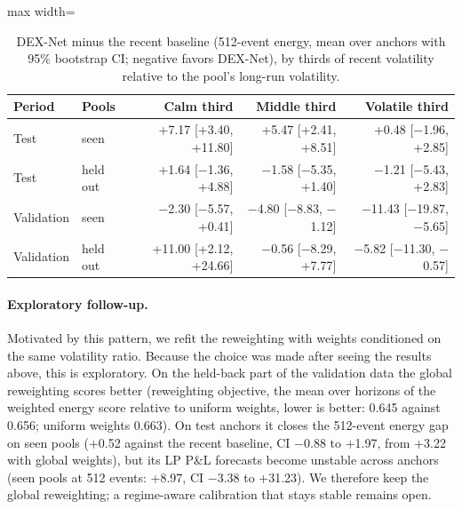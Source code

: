 \documentclass[11pt]{article}
\begin{document}
\begin{table}[t]
\centering
\caption{DEX-Net minus the recent baseline (512-event energy, mean over anchors with 95\% bootstrap CI; negative favors DEX-Net), by thirds of recent volatility relative to the pool's long-run volatility.}\label{tab:6}
\begin{adjustbox}{max width=\linewidth}
\begin{tabular}{llrrr}
\toprule
Period & Pools & Calm third & Middle third & Volatile third \\
\midrule
Test & seen & +7.17 [+3.40, +11.80] & +5.47 [+2.41, +8.51] & +0.48 [\ensuremath{-}1.96, +2.85] \\
\midrule
Test & held out & +1.64 [\ensuremath{-}1.36, +4.88] & \ensuremath{-}1.58 [\ensuremath{-}5.35, +1.40] & \ensuremath{-}1.21 [\ensuremath{-}5.43, +2.83] \\
\midrule
Validation & seen & \ensuremath{-}2.30 [\ensuremath{-}5.57, +0.41] & \ensuremath{-}4.80 [\ensuremath{-}8.83, \ensuremath{-}1.12] & \ensuremath{-}11.43 [\ensuremath{-}19.87, \ensuremath{-}5.65] \\
\midrule
Validation & held out & +11.00 [+2.12, +24.66] & \ensuremath{-}0.56 [\ensuremath{-}8.29, +7.77] & \ensuremath{-}5.82 [\ensuremath{-}11.30, \ensuremath{-}0.57] \\
\bottomrule
\end{tabular}
\end{adjustbox}
\end{table}

\paragraph{Exploratory follow-up.} Motivated by this pattern, we refit the reweighting with weights conditioned on the same volatility ratio. Because the choice was made after seeing the results above, this is exploratory. On the held-back part of the validation data the global reweighting scores better (reweighting objective, the mean over horizons of the weighted energy score relative to uniform weights, lower is better: 0.645 against 0.656; uniform weights 0.663). On test anchors it closes the 512-event energy gap on seen pools (+0.52 against the recent baseline, CI \ensuremath{-}0.88 to +1.97, from +3.22 with global weights), but its LP P\&L forecasts become unstable across anchors (seen pools at 512 events: +8.97, CI \ensuremath{-}3.38 to +31.23). We therefore keep the global reweighting; a regime-aware calibration that stays stable remains open.
\end{document}
